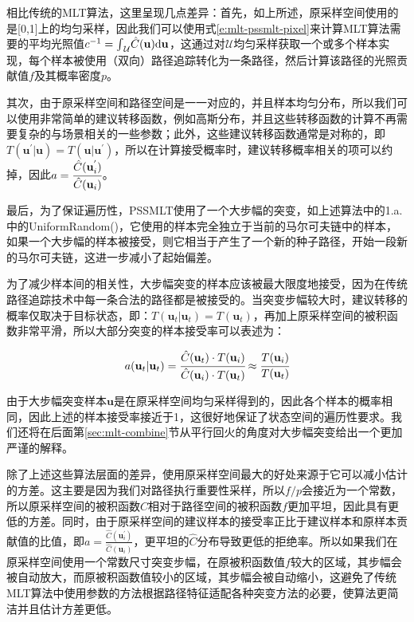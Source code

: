相比传统的MLT算法，这里呈现几点差异：首先，如上所述，原采样空间使用的是[0,1]上的均匀采样，因此我们可以使用式\ref{e:mlt-pssmlt-pixel}来计算MLT算法需要的平均光照值$c^{-1}={\rm \int}_{\mathcal{U}}\hat{C}(\mathbf{u}){\rm d}\mathbf{u}$，这通过对$\mathcal{U}$均匀采样获取一个或多个样本实现，每个样本被使用（双向）路径追踪转化为一条路径，然后计算该路径的光照贡献值$f$及其概率密度$p$。
	
其次，由于原采样空间和路径空间是一一对应的，并且样本均匀分布，所以我们可以使用非常简单的建议转移函数，例如高斯分布，并且这些转移函数的计算不再需要复杂的与场景相关的一些参数；此外，这些建议转移函数通常是对称的，即$T(\mathbf{u}^{'}|\mathbf{u})=T(\mathbf{u}|\mathbf{u}^{'})$，所以在计算接受概率时，建议转移概率相关的项可以约掉，因此$a= \cfrac{\hat{C}(\mathbf{u}^{'}_i)}{\hat{C}(\mathbf{u}_i)}$。

最后，为了保证遍历性，PSSMLT使用了一个大步幅的突变，如上述算法中的1.a.中的UniformRandom()，它使用的样本完全独立于当前的马尔可夫链中的样本，如果一个大步幅的样本被接受，则它相当于产生了一个新的种子路径，开始一段新的马尔可夫链，这进一步减小了起始偏差。

为了减少样本间的相关性，大步幅突变的样本应该被最大限度地接受，因为在传统路径追踪技术中每一条合法的路径都是被接受的。当突变步幅较大时，建议转移的概率仅取决于目标状态，即：$T(\mathbf{u}_t|\mathbf{u}_t)=T(\mathbf{u}_t)$，再加上原采样空间的被积函数非常平滑，所以大部分突变的样本接受率可以表述为：

\begin{equation}
	a(\mathbf{u}_t|\mathbf{u}_t)= \cfrac{\hat{C}(\mathbf{u}_t)\cdot T(\mathbf{u}_i)}{\hat{C}(\mathbf{u}_i)\cdot T(\mathbf{u}_t)}\approx \cfrac{T(\mathbf{u}_i)}{T(\mathbf{u}_t)}
\end{equation}

由于大步幅突变样本$\mathbf{u}$是在原采样空间均匀采样得到的，因此各个样本的概率相同，因此上述的样本接受率接近于1，这很好地保证了状态空间的遍历性要求。我们还将在后面第\ref{sec:mlt-combine}节从平行回火的角度对大步幅突变给出一个更加严谨的解释。

除了上述这些算法层面的差异，使用原采样空间最大的好处来源于它可以减小估计的方差。这主要是因为我们对路径执行重要性采样，所以$f/p$会接近为一个常数，所以原采样空间的被积函数$\hat{C}$相对于路径空间的被积函数$f$更加平坦，因此具有更低的方差。同时，由于原采样空间的建议样本的接受率正比于建议样本和原样本贡献值的比值，即$a=\frac{\hat{C}(\mathbf{u}^{'}_i)}{\hat{C}(\mathbf{u}_i)}$，更平坦的$\hat{C}$分布导致更低的拒绝率。所以如果我们在原采样空间使用一个常数尺寸突变步幅，在原被积函数值$f$较大的区域，其步幅会被自动放大，而原被积函数值较小的区域，其步幅会被自动缩小，这避免了传统MLT算法中使用参数的方法根据路径特征适配各种突变方法的必要，使算法更简洁并且估计方差更低。

